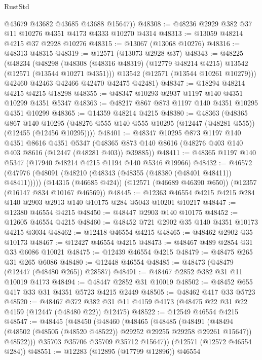 \begin{lexlean}{RustStd}
\begin{coremodule}
        @43679
        @43682
        @43685
        @43688
        @15647))
@48308 := @48236 @2929 @382 @37 @11 @10276 @4351 @4173 @4333 @10270 @4314
@48313 := @13059 @48214 @4215 @37 @2928 @10276
@48315 := @13067 (@13068 @10276)
@48316 := @48313 @48315
@48319 := @12571 (@13073 @2928 @37)
@48343 := @48225
    (@48234
      (@48298
        (@48308 (@48316 @48319) (@12779 @48214 @4215) @13542 (@12571 (@13544 @10271 @4351)))
        @13542
        (@12571 (@13544 @10261 @10279)))
      @42460
      @42463
      @42466
      @42470
      @42475
      @42481)
@48347 := @18294 @48214 @4215 @4215 @18298
@48355 := @48347 @10293 @2937 @1197 @140 @4351 @10299 @4351 @5347
@48363 := @48217 @867 @873 @1197 @140 @4351 @10295 @4351 @10299
@48365 := @14359 @48214 @4215
@48380 := @48363
    (@48365
      @867
      @140
      @10295
      (@48276 @555 @140 @555 @10295 (@12447 (@48281 @555)) (@12455 (@12456 @10295))))
@48401 := @48347
    @10295
    @873
    @1197
    @140
    @4351
    @8616
    @4351
    @5347
    (@48365 @873 @140 @8616 (@48276 @403 @140 @403 @8616 (@12447 (@48281 @403)) @39885))
@48411 := @48365 @1197 @140 @5347 (@17940 @48214 @4215 @1194 @140 @5346 @19966)
@48432 := @46572
    (@47976 (@48091 (@48210 (@48343 (@48355 (@48380 (@48401 @48411)) @48411)))))
    (@14315 (@46685 @424))
    (@12571 (@46689 @46390 @650))
    (@12357 (@16147 @834 @10167 @46569))
@48445 := @12363 @46554 @4215 @4215 @284 @140 @2903 @2913 @140 @10175 @284 @5043 @10201 @10217
@48447 := @12380 @46554 @4215
@48450 := @48447 @2903 @140 @10175
@48452 := @12605 @46554 @4215
@48460 := @48452 @721 @2902 @35 @140 @4351 @10173 @4215 @3034
@48462 := @12418 @46554 @4215
@48465 := @48462 @2902 @35 @10173
@48467 := @12427 @46554 @4215
@48473 := @48467 @489 @2854 @31 @33 @6086 @10021
@48475 := @12439 @46554 @4215
@48479 := @48475 @265 @31 @265 @6086
@48480 := @12448 @46554
@48485 := @48473 (@48479 (@12447 (@48480 @265)) @28587)
@48491 := @48467 @2852 @382 @31 @11 @10019 @4173
@48494 := @48447 @2852 @31 @10019
@48502 := @48452 @655 @417 @33 @31 @4351 @5723 @4215 @2449
@48505 := @48462 @417 @33 @5723
@48520 := @48467
    @372
    @382
    @31
    @11
    @4159
    @4173
    (@48475 @22 @31 @22 @4159 (@12447 (@48480 @22)) @12475)
@48522 := @12549 @46554 @4215
@48547 := @48445
    (@48450
      (@48460
        (@48465
          (@48485
            (@48491
              (@48494 (@48502 (@48505 (@48520 @48522)) @29252 @29255 @29258 @29261 @15647))
              @48522)))
        @35703
        @35706
        @35709
        @35712
        @15647))
    (@12571 (@12572 @46554 @284))
@48551 := @12283 (@12895 (@17799 @12896)) @46554

\end{coremodule}
\end{lexlean}
